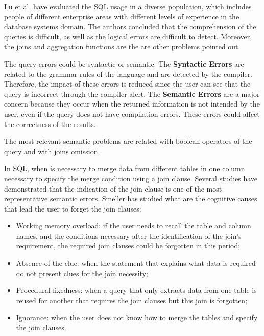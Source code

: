 Lu et al. \cite{aSurveyOnUsageOfSQL} have evaluated the SQL usage in a diverse population, which includes people of different enterprise areas with different levels of experience in the database systems domain. The authors concluded that the comprehension of the queries is difficult, as well as the logical errors are difficult to detect. Moreover, the joins and aggregation functions are the are other problems pointed out.

The query errors could be syntactic or semantic. The \textbf{Syntactic Errors} are related to the grammar rules of the language and are detected by the compiler. Therefore, the impact of these errors is reduced since the user can see that the query is incorrect through the compiler alert. The \textbf{Semantic Errors} are a major concern because they occur when the returned information is not intended by the user, even if the query does not have compilation errors. \cite{userErrorsInDatabaseQueryComposition} These errors could affect the correctness of the results.

The most relevant semantic problems are related with boolean operators of the query and with joins omission.

In SQL, when is necessary to merge data from different tables in one column necessary to specify the merge condition using a join clause. Several studies have demonstrated that the indication of the join clause is one of the most representative semantic errors. \cite{studentsSemanticMistakesInWritingSevenDifferentTypesOfSQLQueries} \cite{aSurveyOnUsageOfSQL} Smeller \cite{userErrorsInDatabaseQueryComposition} has studied what are the cognitive causes that lead the user to forget the join clauses:

\begin{itemize}
  \item Working memory overload: if the user needs to recall the table and column names, and the conditions necessary after the identification of the join's requirement, the required join clauses could be forgotten in this period;
  \item Absence of the clue: when the statement that explains what data is required do not present clues for the join necessity;
  \item Procedural fixedness: when a query that only extracts data from one table is reused for another that requires the join clauses but this join is forgotten;
  \item Ignorance:  when the user does not know how to merge the tables and specify the join clauses.
\end{itemize}

